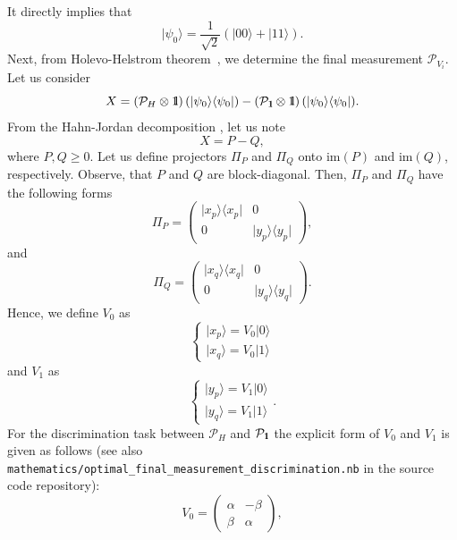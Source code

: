 \documentclass[preprint,12pt, a4paper, dvipsnames]{elsarticle}
\newcommand{\ket}[1]{\ensuremath{|#1\rangle}}
\newcommand{\bra}[1]{\ensuremath{\langle#1|}}
\newcommand{\ketbra}[2]{\ensuremath{\ket{#1}\bra{#2}}}
\newcommand{\proj}[1]{\ensuremath{\ketbra{#1}{#1}}}
\newcommand{\1}{{\rm 1\hspace{-0.9mm}l}}
\newcommand{\Id}{{\rm 1\hspace{-0.9mm}l}}
\newcommand{\PP}{\mathcal{P}}
\theoremstyle{definition}
\begin{document}
 It directly implies that
 \begin{equation}
 \ket{\psi_0} = \frac{1}{\sqrt{2}}(\ket{00} + \ket{11}).  \end{equation}
 Next, from Holevo-Helstrom theorem~\cite{watrous}, we determine the final measurement $\PP_{V_i}$.
 Let us consider \begin{equation}
 X = \left(\PP_{H} \otimes \Id \right)(\proj{\psi_0}) - \left(\PP_{\Id} \otimes \Id \right) (\proj{\psi_0}).
  \end{equation}
 From the Hahn-Jordan decomposition \cite{watrous}, let us note
 \begin{equation}
 X = P - Q,
 \end{equation}
 where $P, Q \ge 0 $.
 Let us define projectors $\Pi_P$ and $\Pi_Q$ onto  $\text{im}(P)$ and $\text{im}(Q)$,
 respectively. Observe, that $P $ and $Q$ are block-diagonal.  Then,  $\Pi_P$ and $\Pi_Q$ have the following forms
 \begin{equation}
 \Pi_P = \left(\begin{array}{cc}\proj{x_p}&0\\0&\proj{y_p}\end{array}\right),
 \end{equation}
 and
 \begin{equation}
 \Pi_Q = \left(\begin{array}{cc}\proj{x_q}&0\\0&\proj{y_q}\end{array}\right).
 \end{equation}
 Hence, we define $V_0$ as
 \begin{equation}
 \begin{cases} \ket{x_p} =  V_0  \ket{0} \\  \ket{x_q} =  V_0 \ket{1} \end{cases}
 \end{equation}
 and $V_1$ as
 \begin{equation}
 \begin{cases}
 \ket{y_p} =   V_1 \ket{0} \\
  \ket{y_q} = V_1  \ket{1}
 \end{cases}.
 \end{equation}
 For the discrimination task between $\PP_{H}$ and $\PP_{\Id}$ the explicit form of $V_0$ and $V_1$ is given as follows (see also \texttt{mathematics/optimal\_final\_measurement\_discrimination.nb} in the source code repository):
 \begin{equation}
 V_0 =
 \left(\begin{array}{cc} \alpha & -\beta\\ \beta & \alpha \end{array}\right),
 \end{equation}
\end{document}
